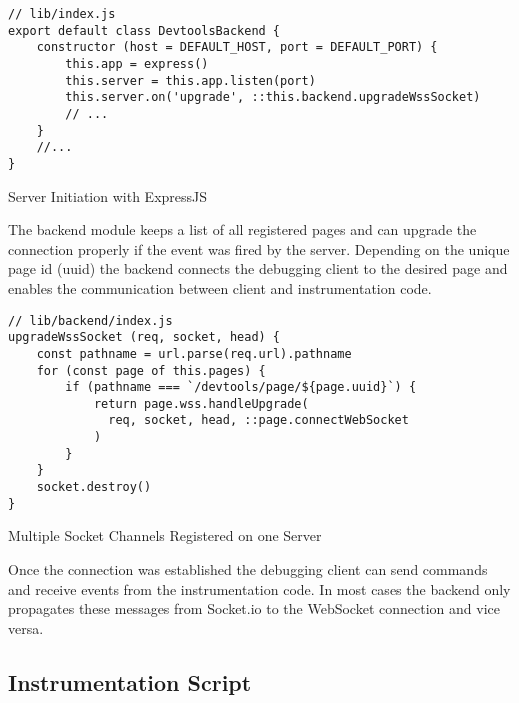 \begin{listing}[H]
\begin{verbatim}
// lib/index.js
export default class DevtoolsBackend {
    constructor (host = DEFAULT_HOST, port = DEFAULT_PORT) {
        this.app = express()
        this.server = this.app.listen(port)
        this.server.on('upgrade', ::this.backend.upgradeWssSocket)
        // ...
    }
    //...
}
\end{verbatim}
\caption{Server Initiation with ExpressJS}
\label{lst:socket}
\end{listing}

The backend module keeps a list of all registered pages and can upgrade the connection properly if
the event was fired by the server. Depending on the unique page id (uuid) the backend connects the
debugging client to the desired page and enables the communication between client and instrumentation
code.

\begin{listing}[H]
\begin{verbatim}
// lib/backend/index.js
upgradeWssSocket (req, socket, head) {
    const pathname = url.parse(req.url).pathname
    for (const page of this.pages) {
        if (pathname === `/devtools/page/${page.uuid}`) {
            return page.wss.handleUpgrade(
              req, socket, head, ::page.connectWebSocket
            )
        }
    }
    socket.destroy()
}
\end{verbatim}
\caption{Multiple Socket Channels Registered on one Server}
\label{lst:socket}
\end{listing}

Once the connection was established the debugging client can send commands and receive events from
the instrumentation code. In most cases the backend only propagates these messages from Socket.io
to the WebSocket connection and vice versa.

\subsection{Instrumentation Script}

